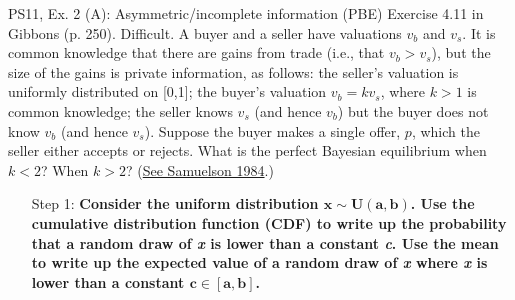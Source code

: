 \begin{frame}{PS11, Ex. 2 (A): Asymmetric/incomplete information (PBE)}
    Exercise 4.11 in Gibbons (p. 250). Difficult. A buyer and a seller have valuations $v_b$ and $v_s$. It is common knowledge that there are gains from trade (i.e., that $v_b > v_s$), but the size of the gains is private information, as follows: the seller’s valuation is uniformly distributed on [0,1]; the buyer’s valuation $v_b = kv_s$, where $k > 1$ is common knowledge; the seller knows $v_s$ (and hence $v_b$) but the buyer does not know $v_b$ (and hence $v_s$). Suppose the buyer makes a single offer, $p$, which the seller either accepts or rejects. What is the perfect Bayesian equilibrium when $k < 2$? When $k > 2$? (\href{https://www.jstor.org/stable/1911195}{See Samuelson 1984}.) \vspace{-8pt}
    \begin{multicols}{2}
      \begin{itemize}
        \item[Step 1:] \textbf{Consider the uniform distribution $\bm{x\sim U(a, b)}$. Use the cumulative distribution function (CDF) to write up the probability that a random draw of \textit{x} is lower than a constant \textit{c}. Use the mean to write up the expected value of a random draw of \textit{x} where \textit{x} is lower than a constant $\bm{c\in[a,b]}$.}
      \end{itemize}
      \vfill\null\columnbreak
      \vfill\null
    \end{multicols}
\end{frame}
